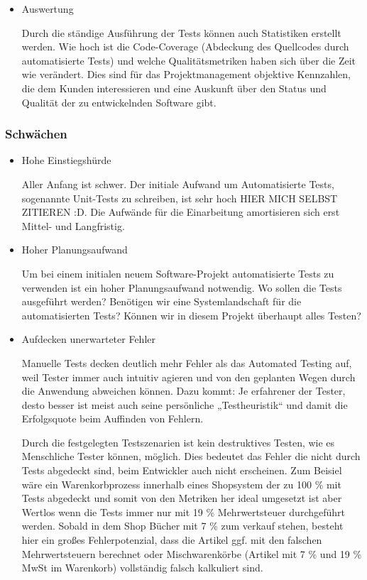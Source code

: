 \begin{itemize}
	\item Auswertung
	
	Durch die ständige Ausführung der Tests können auch Statistiken erstellt werden. Wie hoch ist die Code-Coverage (Abdeckung des Quellcodes durch automatisierte Tests) und welche Qualitätsmetriken haben sich über die Zeit wie verändert. Dies sind für das Projektmanagement objektive Kennzahlen, die dem Kunden interessieren und eine Auskunft über den Status und Qualität der zu entwickelnden Software gibt.

\end{itemize}

\subsubsection{Schwächen}
\begin{itemize}	
	\item Hohe Einstiegshürde
	
	Aller Anfang ist schwer. Der initiale Aufwand um Automatisierte Tests, sogenannte Unit-Tests zu schreiben, ist sehr hoch HIER MICH SELBST ZITIEREN :D. Die Aufwände für die Einarbeitung amortisieren sich erst Mittel- und Langfristig.
	
	\item Hoher Planungsaufwand
	
	Um bei einem initialen neuem Software-Projekt automatisierte Tests zu verwenden ist ein hoher Planungsaufwand notwendig. Wo sollen die Tests ausgeführt werden? Benötigen wir eine Systemlandschaft für die automatisierten Tests? Können wir in diesem Projekt überhaupt alles Testen?
	
	\item Aufdecken unerwarteter Fehler
	
	Manuelle Tests decken deutlich mehr Fehler als das Automated Testing auf, weil Tester immer auch intuitiv agieren und von den geplanten Wegen durch die Anwendung abweichen können. Dazu kommt: Je erfahrener der Tester, desto besser ist meist auch seine persönliche „Testheuristik“ und damit die Erfolgsquote beim Auffinden von Fehlern.
	
	Durch die festgelegten Testszenarien ist kein destruktives Testen, wie es Menschliche Tester können, möglich. Dies bedeutet das Fehler die nicht durch Tests abgedeckt sind, beim Entwickler auch nicht erscheinen. Zum Beisiel wäre ein Warenkorbprozess innerhalb eines Shopsystem der zu 100 \% mit Tests abgedeckt und somit von den Metriken her ideal umgesetzt ist aber Wertlos wenn die Tests immer nur mit 19 \% Mehrwertsteuer durchgeführt werden. Sobald in dem Shop Bücher mit 7 \% zum verkauf stehen, besteht hier ein großes Fehlerpotenzial, dass die Artikel ggf. mit den falschen Mehrwertsteuern berechnet oder Mischwarenkörbe (Artikel mit 7 \% und 19 \% MwSt im Warenkorb) vollständig falsch kalkuliert sind. 
	
\end{itemize}
